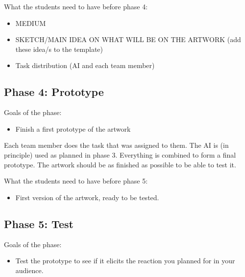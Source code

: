 \documentclass[12pt]{article}
\begin{document}
What the students need to have before phase 4:

\begin{itemize}
\item MEDIUM
\item SKETCH/MAIN IDEA ON WHAT WILL BE ON THE ARTWORK (add these idea/s to the template)
\item Task distribution (AI and each team member)
\end{itemize}

\subsection{Phase 4: Prototype}

Goals of the phase: 
\begin{itemize}
\item Finish a first prototype of the artwork
\end{itemize}

Each team member does the task that was assigned to them. The AI is (in principle) used as planned in phase 3.
Everything is combined to form a final prototype. The artwork should be as finished as possible to be able to test it.

What the students need to have before phase 5:
\begin{itemize}
\item First version of the artwork, ready to be tested.
\end{itemize}

\subsection{Phase 5: Test}

Goals of the phase: 
\begin{itemize}
\item Test the prototype to see if it elicits the reaction you planned for in your audience.
\end{itemize}
\end{document}
